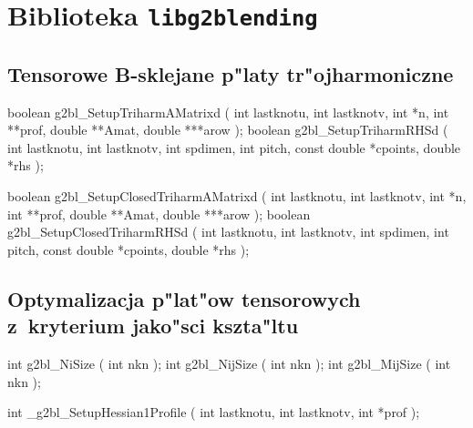 

\chapter{Biblioteka \texttt{libg2blending}}

\section{Tensorowe B-sklejane p"laty tr"ojharmoniczne}

\begin{listingC}
boolean g2bl_SetupTriharmAMatrixd ( int lastknotu, int lastknotv,
                           int *n, int **prof, double **Amat, double ***arow );
boolean g2bl_SetupTriharmRHSd ( int lastknotu, int lastknotv,
                           int spdimen, int pitch, const double *cpoints,
                           double *rhs );

boolean g2bl_SetupClosedTriharmAMatrixd ( int lastknotu, int lastknotv,
                           int *n, int **prof, double **Amat, double ***arow );
boolean g2bl_SetupClosedTriharmRHSd ( int lastknotu, int lastknotv,
                           int spdimen, int pitch, const double *cpoints,
                           double *rhs );
\end{listingC}


\section{Optymalizacja p"lat"ow tensorowych z~kryterium jako"sci kszta"ltu}

\begin{listingC}
int g2bl_NiSize ( int nkn );
int g2bl_NijSize ( int nkn );
int g2bl_MijSize ( int nkn );
\end{listingC}

\begin{listingC}
int _g2bl_SetupHessian1Profile ( int lastknotu, int lastknotv, int *prof );
\end{listingC}

